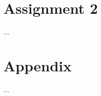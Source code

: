 \documentclass[a4paper, twocolumn]{article}
\begin{document}
    \newpage

    \section*{Assignment 2}

    ...

    \clearpage \nocite{*}
    
    

    \onecolumn \appendix
    \section*{Appendix}

    ...
\end{document}

